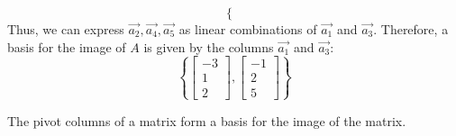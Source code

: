 \begin{eg}
\[\begin{cases}
    \end{cases} \]
    Thus, we can express $\vec{a_2}, \vec{a_4}, \vec{a_5}$ as linear combinations of $\vec{a_1}$ and $\vec{a_3}$. Therefore, a basis for the image of $A$ is given by the columns $\vec{a_1}$ and $\vec{a_3}$:
    \[ \left\{ \begin{bmatrix}
        -3 \\ 1 \\ 2
    \end{bmatrix}, \begin{bmatrix}
        -1 \\ 2 \\ 5
    \end{bmatrix} \right\} \]
\end{eg}

\begin{theorem}
    The pivot columns of a matrix form a basis for the image of the matrix.
\end{theorem}


